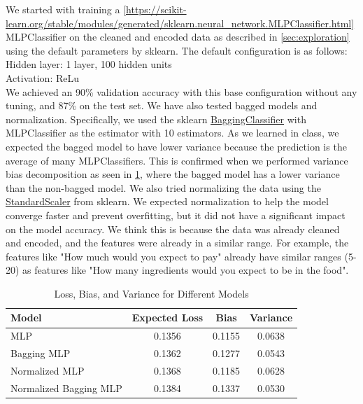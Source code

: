 We started with training a \ref{https://scikit-learn.org/stable/modules/generated/sklearn.neural_network.MLPClassifier.html}{MLPClassifier}
on the cleaned and encoded data as described in \ref{sec:exploration} using the default parameters by
sklearn.
The default configuration is as follows:\\
Hidden layer: 1 layer, 100 hidden units\\
Activation: ReLu\\
We achieved an 90\% validation accuracy with this base configuration without any tuning, and 87\% on the test set.
We have also tested bagged models and normalization. Specifically, we used the sklearn \href{https://scikit-learn.org/stable/modules/generated/sklearn.ensemble.BaggingClassifier.html}{BaggingClassifier}
with MLPClassifier as the estimator with 10 estimators. As we learned in class, we expected the bagged model to have lower variance because the prediction is the average of many MLPClassifiers.
This is confirmed when we performed variance bias decomposition as seen in \ref{tab:nn_bias_var}, where the bagged model has a lower variance than the non-bagged model.
We also tried normalizing the data using the \href{https://scikit-learn.org/stable/modules/generated/sklearn.preprocessing.StandardScaler.html}{StandardScaler} from sklearn.
We expected normalization to help the model converge faster and prevent overfitting, but it did not have a significant impact on the model accuracy.
We think this is because the data was already cleaned and encoded, and the features were already in a similar range.
For example, the features like "How much would you expect to pay" already have similar ranges (5-20) as features like "How many ingredients would you expect to be in the food".

\begin{table}[ht]
    \centering
    \begin{tabular}{lccc}
        \hline
        Model                  & Expected Loss & Bias   & Variance \\
        \hline
        MLP                    & 0.1356        & 0.1155 & 0.0638   \\
        Bagging MLP            & 0.1362        & 0.1277 & 0.0543   \\
        Normalized MLP         & 0.1368        & 0.1185 & 0.0628   \\
        Normalized Bagging MLP & 0.1384        & 0.1337 & 0.0530   \\
        \hline
    \end{tabular}
    \caption{Loss, Bias, and Variance for Different Models}
    \label{tab:nn_bias_var}
\end{table}

